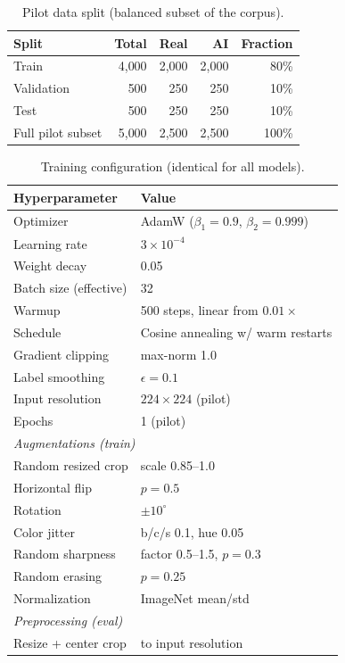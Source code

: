 \documentclass[journal]{IEEEtran}
\begin{document}
\begin{table}[!t]
\renewcommand{\arraystretch}{1.2}
\caption{Pilot data split (balanced subset of the corpus).}
\label{tab:split}
\centering
\begin{tabular}{lrrrr}
\toprule
Split & Total & Real & AI & Fraction \\
\midrule
Train      & 4{,}000 & 2{,}000 & 2{,}000 & 80\% \\
Validation & 500     & 250     & 250     & 10\% \\
Test       & 500     & 250     & 250     & 10\% \\
\midrule
Full pilot subset & 5{,}000 & 2{,}500 & 2{,}500 & 100\% \\
\bottomrule
\end{tabular}
\end{table}

\begin{table}[!t]
\renewcommand{\arraystretch}{1.15}
\caption{Training configuration (identical for all models).}
\label{tab:hyper}
\centering
\setlength{\tabcolsep}{4pt}
\begin{tabular}{ll}
\toprule
Hyperparameter & Value \\
\midrule
Optimizer & AdamW ($\beta_1{=}0.9$, $\beta_2{=}0.999$) \\
Learning rate & $3\times10^{-4}$ \\
Weight decay & 0.05 \\
Batch size (effective) & 32 \\
Warmup & 500 steps, linear from $0.01\times$ \\
Schedule & Cosine annealing w/ warm restarts \\
Gradient clipping & max-norm 1.0 \\
Label smoothing & $\epsilon = 0.1$ \\
Input resolution & $224\times224$ (pilot) \\
Epochs & 1 (pilot) \\
\midrule
\multicolumn{2}{l}{\textit{Augmentations (train)}} \\
Random resized crop & scale 0.85--1.0 \\
Horizontal flip & $p = 0.5$ \\
Rotation & $\pm 10^{\circ}$ \\
Color jitter & b/c/s 0.1, hue 0.05 \\
Random sharpness & factor 0.5--1.5, $p{=}0.3$ \\
Random erasing & $p = 0.25$ \\
Normalization & ImageNet mean/std \\
\midrule
\multicolumn{2}{l}{\textit{Preprocessing (eval)}} \\
Resize + center crop & to input resolution \\
\bottomrule
\end{tabular}
\end{table}
\end{document}
